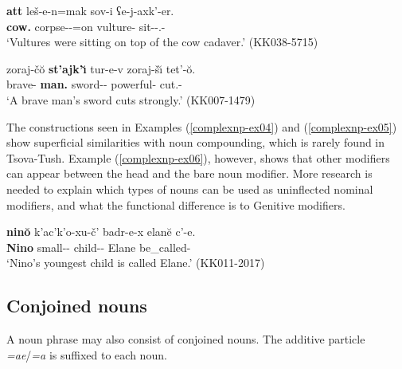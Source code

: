 \begin{exe}
	\ex\label{complexnp-ex05}
	\begin{xlist}
		
		\ex\label{complexnp-ex05a}
		\gll \textbf{att} leš-e-n=mak sov-i ʕe-j-axk'-er.  \\
		\textbf{cow.{\Obl}} corpse-{\Obl}-{\Dat}=on vulture-{\Pl} sit-{\J}-{\Lv}.{\Pl}-{\Imprf}  \\
		\trans `Vultures were sitting on top of the cow cadaver.'
		\hfill (KK038-5715) 
		
		\ex\label{complexnp-ex05b}
		\gll zoraj-č\u{o} \textbf{st'ajk'\u{\i}} tur-e-v zoraj-š\u{\i} tet'-\u{o}. \\
		brave-{\Obl} \textbf{man.{\Obl}} sword-{\Obl}-{\Erg} powerful-{\Adv} cut.{\Ipfv}-{\Npst} \\
		\trans `A brave man's sword cuts strongly.'
		\hfill (KK007-1479)
		
	\end{xlist}
\end{exe}    

The constructions seen in Examples (\ref{complexnp-ex04}) and (\ref{complexnp-ex05}) show superficial similarities with noun compounding, which is rarely found in Tsova-Tush. Example (\ref{complexnp-ex06}), however, shows that other modifiers can appear between the head and the bare noun modifier. More research is needed to explain which types of nouns can be used as uninflected nominal modifiers, and what the functional difference is to Genitive modifiers. 

\begin{exe}
	\ex\label{complexnp-ex06}
	\gll  \textbf{nin\u{o}} k'ac'k'o-xu-č' badr-e-x elan\u{e} c'-e. \\
	\textbf{Nino} small-{\Cmp}-{\Superl} child-{\Obl}-{\Cont} Elane be\_called-{\Npst}  \\
	\trans `Nino's youngest child is called Elane.'
	\hfill (KK011-2017)
\end{exe}




\subsection{Conjoined nouns} \label{conjoined}

A noun phrase may also consist of conjoined nouns. The additive particle \textit{=ae}/\textit{=a} is suffixed to each noun.

